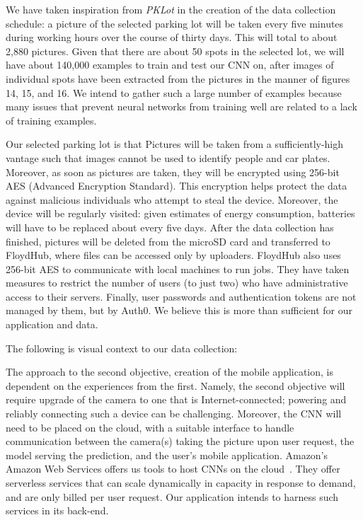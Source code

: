 \documentclass[a4paper, 11pt]{article} %
\begin{document}
We have taken inspiration from \textit{PKLot} in the creation of the data collection schedule: a 
picture of the selected parking lot will be taken every five minutes during working hours over the 
course of thirty days. This will total to about 2,880 pictures. Given that there are about 50 spots 
in the selected lot, we will have about 140,000 examples to train and test our CNN on, after images
of 	individual spots have been extracted from the pictures in the manner of figures 14, 15, and 16. 
We intend to gather such a large number of examples because many issues that prevent neural 
networks from training well are related to a lack of training examples.

Our selected parking lot is that  Pictures will be 
taken from a sufficiently-high vantage such that images cannot be used to identify people and car 
plates. Moreover, as soon as pictures are taken, they will be encrypted using 256-bit AES 
(Advanced Encryption Standard). This encryption helps protect the data against malicious 
individuals who attempt to steal the device. Moreover, the device will be regularly visited: given 
estimates of energy consumption, batteries will have to be replaced about every five days. After 
the data collection has finished, pictures will be deleted from the microSD card and transferred to 
FloydHub, where files can be accessed only by uploaders. FloydHub also uses 256-bit AES to 
communicate with local machines to run jobs. They have taken measures to restrict the number of 
users (to just two) who have administrative access to their servers. Finally, user passwords and 
authentication tokens are not managed by them, but by Auth0. We believe this is more than 
sufficient for our application and data.

\hspace*{-6mm}The following is visual context to our data collection:

\newpage
The approach to the second objective, creation of the mobile application, is dependent on the 
experiences from the first. Namely, the second objective will require upgrade of the camera to one 
that is Internet-connected; powering and reliably connecting such a device can be challenging. 
Moreover, the CNN will need to be placed on the cloud, with a suitable interface to handle 
communication between the camera(s) taking the picture upon user request, the model serving 
the prediction, and the user's mobile application. Amazon's Amazon Web Services offers us tools 
to host CNNs on the cloud~\cite{aws}\relax. They offer serverless services that can scale 
dynamically in capacity in response to demand, and are only billed per user request. Our 
application intends to harness such services in its back-end.
\end{document}
